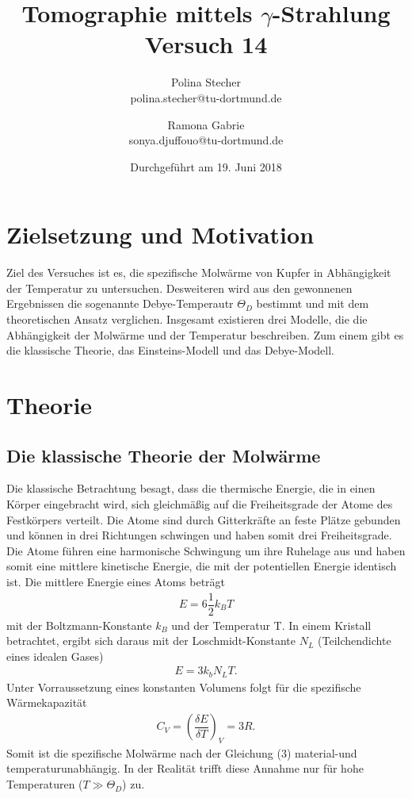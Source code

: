 \documentclass{article}
\begin{document}
	\scriptsize \normalsize
	\title{ Tomographie mittels $\gamma$-Strahlung  \\ Versuch 14}
	

	
	\author{Polina Stecher\\ {polina.stecher@tu-dortmund.de}  \and   Ramona Gabrie\\ {sonya.djuffouo@tu-dortmund.de}} %
	\date{Durchgeführt am  19. Juni  2018}
		\maketitle
	\newpage
	\tableofcontents
	\thispagestyle{empty}
	\newpage
	\newpage
	
\section{Zielsetzung und Motivation}
Ziel des Versuches ist es, die spezifische Molwärme von Kupfer in Abhängigkeit der Temperatur zu untersuchen. Desweiteren wird aus den gewonnenen Ergebnissen die sogenannte Debye-Temperautr $\Theta_D$ bestimmt und mit dem theoretischen Ansatz verglichen. Insgesamt existieren drei Modelle, die die Abhängigkeit der Molwärme und der Temperatur beschreiben. Zum einem gibt es die klassische Theorie, das Einsteins-Modell und das Debye-Modell.

\section{Theorie} 
\subsection{Die klassische Theorie der Molwärme}
Die klassische Betrachtung besagt, dass die thermische Energie, die in einen Körper eingebracht wird, sich gleichmäßig auf die Freiheitsgrade der Atome des Festkörpers verteilt. Die Atome sind durch Gitterkräfte an feste Plätze gebunden und können in drei Richtungen schwingen und haben somit drei Freiheitsgrade. Die Atome führen eine harmonische Schwingung um ihre Ruhelage aus und haben somit eine mittlere kinetische Energie, die mit der potentiellen Energie identisch ist. Die mittlere Energie eines Atoms beträgt
\begin{align}
E=6\dfrac{1}{2}k_BT
\end{align}
mit der Boltzmann-Konstante $k_B$  und der Temperatur T. In einem Kristall betrachtet, ergibt sich daraus mit der Loschmidt-Konstante $N_L$ (Teilchendichte eines idealen Gases)
\begin{align}
E=3k_bN_LT.
\end{align}
Unter Vorraussetzung eines konstanten Volumens folgt für die spezifische Wärmekapazität
\begin{align}
C_V=(\dfrac{\delta E}{\delta T})_V=3R.
\end{align}
Somit ist die spezifische Molwärme nach der Gleichung (3) material-und temperaturunabhängig. In der Realität trifft diese Annahme nur für hohe Temperaturen ($T\gg\Theta_D$) zu. 
\end{document}
